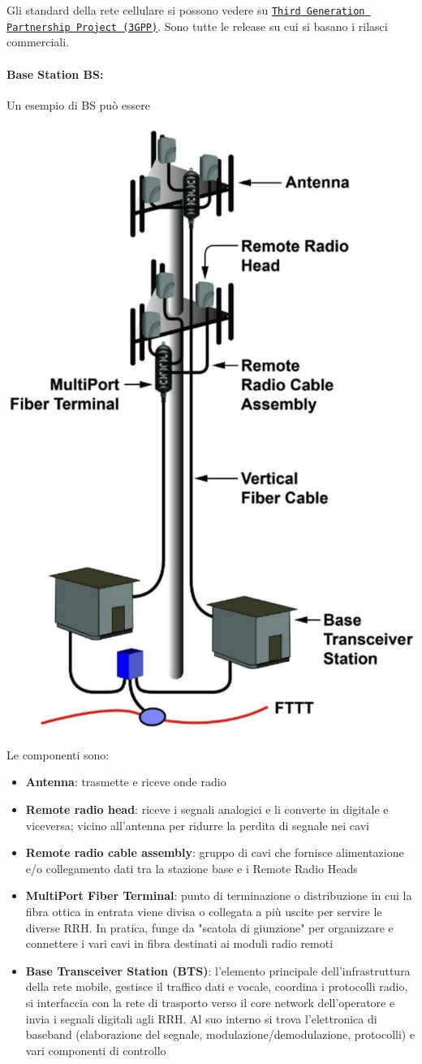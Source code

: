 Gli standard della rete cellulare si possono vedere su \href{https://www.3gpp.org/specifications-technologies/releases}{\texttt{Third Generation Partnership Project (3GPP)}}. Sono tutte le release su cui si basano i rilasci commerciali.

\paragraph{Base Station BS:} Un esempio di BS può essere
\begin{center}
	\includegraphics[width=0.4\linewidth]{img/mobile/1BS}
\end{center}

Le componenti sono:
\begin{itemize}
	\item \textbf{Antenna}: trasmette e riceve onde radio

	\item \textbf{Remote radio head}: riceve i segnali analogici e li converte in digitale e viceversa; vicino all'antenna per ridurre la perdita di segnale nei cavi

	\item \textbf{Remote radio cable assembly}: gruppo di cavi che fornisce alimentazione e/o collegamento dati tra la stazione base e i Remote Radio Heads

	\item \textbf{MultiPort Fiber Terminal}: punto di terminazione o distribuzione in cui la fibra ottica in entrata viene divisa o collegata a più uscite per servire le diverse RRH. In pratica, funge da "scatola di giunzione" per organizzare e connettere i vari cavi in fibra destinati ai moduli radio remoti
	
    \item \textbf{Base Transceiver Station (BTS)}: l'elemento principale dell'infrastruttura della rete mobile, gestisce il traffico dati e vocale, coordina i protocolli radio, si interfaccia con la rete di trasporto verso il core network dell'operatore e invia i segnali digitali agli RRH. Al suo interno si trova l'elettronica di baseband (elaborazione del segnale, modulazione/demodulazione, protocolli) e vari componenti di controllo
\end{itemize}

